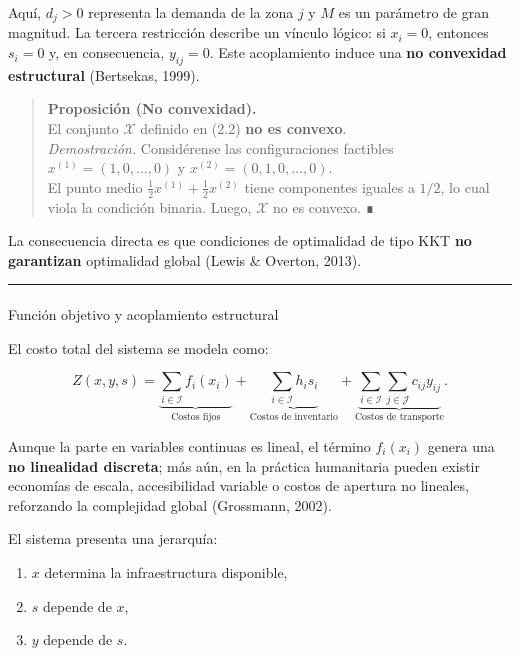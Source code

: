 \documentclass[
  spanish,
  letterpaper,
  DIV=11,
  numbers=noendperiod]{scrartcl}
\makeatletter
\let\oldparagraph\paragraph
\renewcommand{\paragraph}{
    \@ifstar
      \xxxParagraphStar
      \xxxParagraphNoStar
  }
\newcommand{\xxxParagraphStar}[1]{\oldparagraph*{#1}\mbox{}}
\newcommand{\xxxParagraphNoStar}[1]{\oldparagraph{#1}\mbox{}}
\providecommand{\tightlist}{%
  \setlength{\itemsep}{0pt}\setlength{\parskip}{0pt}}
\makeatother
\begin{document}
Aquí, \(d_j > 0\) representa la demanda de la zona \(j\) y \(M\) es un
parámetro de gran magnitud. La tercera restricción describe un vínculo
lógico: si \(x_i = 0\), entonces \(s_i = 0\) y, en consecuencia,
\(y_{ij} = 0\). Este acoplamiento induce una \textbf{no convexidad
estructural} (Bertsekas, 1999).

\begin{quote}
\textbf{Proposición (No convexidad).}\\
El conjunto \(\mathcal{X}\) definido en (2.2) \textbf{no es convexo}.\\
\emph{Demostración.} Considérense las configuraciones factibles
\(x^{(1)}=(1,0,\dots,0)\) y \(x^{(2)}=(0,1,0,\dots,0)\).\\
El punto medio \(\tfrac12 x^{(1)} + \tfrac12 x^{(2)}\) tiene componentes
iguales a \(1/2\), lo cual viola la condición binaria. Luego,
\(\mathcal{X}\) no es convexo. ∎
\end{quote}

La consecuencia directa es que condiciones de optimalidad de tipo KKT
\textbf{no garantizan} optimalidad global (Lewis \& Overton, 2013).

\begin{center}\rule{0.5\linewidth}{0.5pt}\end{center}

\paragraph{Función objetivo y acoplamiento
estructural}\label{funciuxf3n-objetivo-y-acoplamiento-estructural}

El costo total del sistema se modela como:

\[
Z(x,y,s) 
= 
\underbrace{\sum_{i\in\mathcal{I}} f_i(x_i)}_{\text{Costos fijos}}
+ \underbrace{\sum_{i\in\mathcal{I}} h_i s_i}_{\text{Costos de inventario}}
+ \underbrace{\sum_{i\in\mathcal{I}}\sum_{j\in\mathcal{J}} c_{ij} y_{ij}}_{\text{Costos de transporte}}.
\tag{2.3}
\]

Aunque la parte en variables continuas es lineal, el término
\(f_i(x_i)\) genera una \textbf{no linealidad discreta}; más aún, en la
práctica humanitaria pueden existir economías de escala, accesibilidad
variable o costos de apertura no lineales, reforzando la complejidad
global (Grossmann, 2002).

El sistema presenta una jerarquía:

\begin{enumerate}
\def\labelenumi{\arabic{enumi}.}
\tightlist
\item
  \(x\) determina la infraestructura disponible,\\
\item
  \(s\) depende de \(x\),\\
\item
  \(y\) depende de \(s\).
\end{enumerate}
\end{document}
